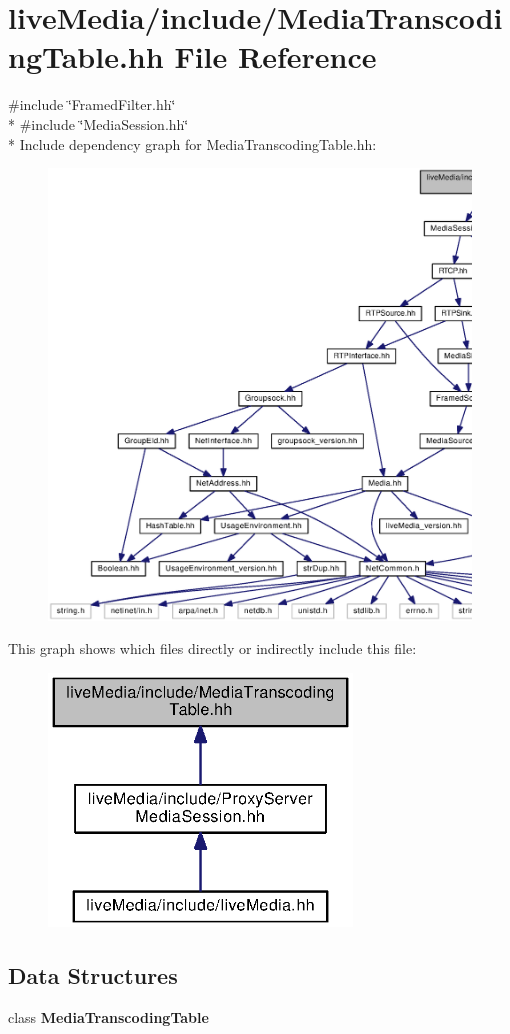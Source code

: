 \section{live\+Media/include/\+Media\+Transcoding\+Table.hh File Reference}
\label{MediaTranscodingTable_8hh}
{\ttfamily \#include \char`\"{}Framed\+Filter.\+hh\char`\"{}}\\*
{\ttfamily \#include \char`\"{}Media\+Session.\+hh\char`\"{}}\\*
Include dependency graph for Media\+Transcoding\+Table.\+hh\+:
\nopagebreak
\begin{figure}[H]
\begin{center}
\leavevmode
\includegraphics[width=350pt]{MediaTranscodingTable_8hh__incl}
\end{center}
\end{figure}
This graph shows which files directly or indirectly include this file\+:
\nopagebreak
\begin{figure}[H]
\begin{center}
\leavevmode
\includegraphics[width=229pt]{MediaTranscodingTable_8hh__dep__incl}
\end{center}
\end{figure}
\subsection*{Data Structures}
\begin{DoxyCompactItemize}
\item 
class {\bf Media\+Transcoding\+Table}
\end{DoxyCompactItemize}
